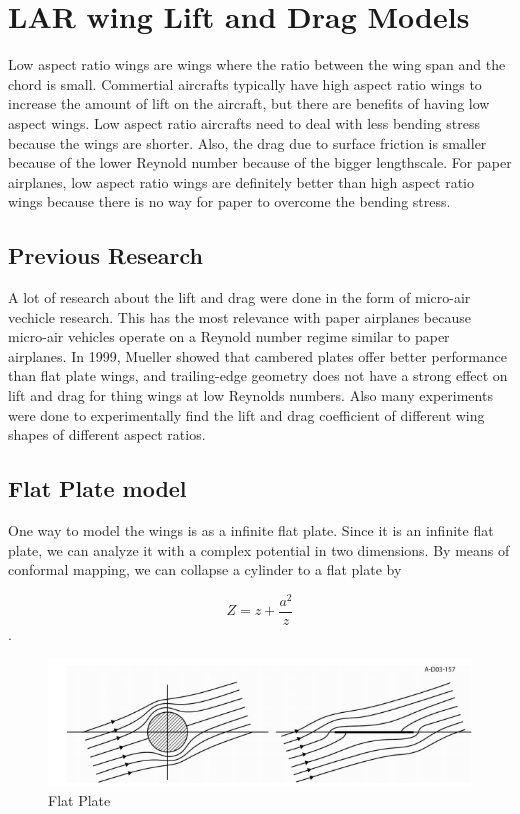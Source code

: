 
\section{LAR wing Lift and Drag Models}

Low aspect ratio wings are wings where the ratio between the wing span and
the chord is small. Commertial aircrafts typically have high aspect ratio wings
to increase the amount of lift on the aircraft, but there are benefits of having
low aspect wings. Low aspect ratio aircrafts need to deal with less bending
stress because the wings are shorter. Also, the drag due to surface friction is
smaller because of the lower Reynold number because of the bigger lengthscale.
For paper airplanes, low aspect ratio wings are definitely better than high
aspect ratio wings because there is no way for paper to overcome the
bending stress.


\subsection{Previous Research}

A lot of research about the lift and drag  were done in the form of
micro-air vechicle research. This has the most relevance with paper airplanes because
micro-air vehicles operate on a Reynold number regime similar to paper airplanes. 
In 1999, Mueller showed that cambered plates offer better performance than flat plate wings, and
trailing-edge geometry does not have a strong effect on lift and drag
for thing wings at low Reynolds numbers. Also many experiments were done to experimentally
find the lift and drag coefficient of different wing shapes of different aspect ratios.

\subsection{Flat Plate model}

One way to model the wings is as a infinite flat plate. Since it is
an infinite flat plate, we can analyze it with a complex potential in two dimensions.
By means of conformal mapping, we can collapse a cylinder to a flat plate by

\[Z = z + \frac{a^2}{z}\].

\begin{figure}[hl]
  \centering
    \includegraphics[scale=.5]{figures/flatplate1.png}
    \caption{Flat Plate}
  \label{fig:dihedraleffect}
\end{figure}

